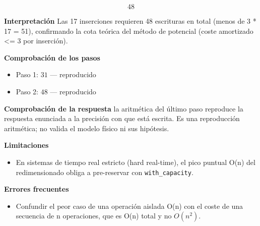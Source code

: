 \documentclass{book}
\begin{document}
\begin{tcolorbox}[title={Problema resuelto}, studiumworked, breakable]
\[
48
\]

\noindent\textbf{Interpretación}
Las 17 inserciones requieren 48 escrituras en total (menos de 3 * 17 = 51), confirmando la cota teórica del método de potencial (coste amortizado <= 3 por inserción).

\noindent\textbf{Comprobación de los pasos}
\begin{itemize}
\item Paso 1: $31$ — reproducido
\item Paso 2: $48$ — reproducido
\end{itemize}

\noindent\textbf{Comprobación de la respuesta} la aritmética del último paso reproduce la respuesta enunciada a la precisión con que está escrita. Es una reproducción aritmética; no valida el modelo físico ni sus hipótesis.

\noindent\textbf{Limitaciones}
\begin{itemize}
\item En sistemas de tiempo real estricto (hard real-time), el pico puntual O(n) del redimensionado obliga a pre-reservar con \texttt{with\_capacity}.
\end{itemize}

\noindent\textbf{Errores frecuentes}
\begin{itemize}
\item Confundir el peor caso de una operación aislada O(n) con el coste de una secuencia de n operaciones, que es O(n) total y no \(O(n^2)\).
\end{itemize}
\end{tcolorbox}
\end{document}
